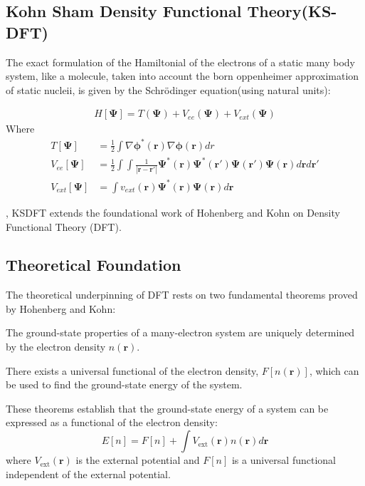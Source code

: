 \subsection{Kohn Sham Density Functional Theory(KS-DFT)}
The exact formulation of the Hamiltonial of the electrons of a static many body system, like a molecule, taken into account the born oppenheimer approximation of static nucleii, is given by the Schrödinger equation(using natural units):


\begin{align}
H[\mathbf{\Psi}] = T(\mathbf{\Psi}) + V_{ee}(\mathbf{\Psi}) + V_{ext}(\mathbf{\Psi})
\end{align}
Where
\begin{align}
    T[\mathbf{\Psi}] &= \frac{1}{2}\int\nabla\mathbf{\phi}^*(\mathbf{r})\nabla\mathbf{\phi}(\mathbf{r}) dr \\
    V_{ee}[\mathbf{\Psi}] &= \frac{1}{2}\int\int\frac{1}{|\mathbf{r}-\mathbf{r'}|}\mathbf{\Psi}^*(\mathbf{r})\mathbf{\Psi}^*(\mathbf{r}')\mathbf{\Psi}(\mathbf{r}')\mathbf{\Psi}(\mathbf{r})d\mathbf{r}d\mathbf{r'}\\
    V_{ext}[\mathbf{\Psi}] &= \int v_{ext}(\mathbf{r})\mathbf{\Psi}^*(\mathbf{r})\mathbf{\Psi}(\mathbf{r})d\mathbf{r}
    \end{align}

 \cite{KohnSham1965}, KSDFT extends the foundational work of Hohenberg and Kohn \cite{HohenbergKohn1964} on Density Functional Theory (DFT).
















\subsection{Theoretical Foundation}
The theoretical underpinning of DFT rests on two fundamental theorems proved by Hohenberg and Kohn:
\begin{theorem}
The ground-state properties of a many-electron system are uniquely determined by the electron density $n(\mathbf{r})$.
\end{theorem}
\begin{theorem}
There exists a universal functional of the electron density, $F[n(\mathbf{r})]$, which can be used to find the ground-state energy of the system.
\end{theorem}
These theorems establish that the ground-state energy of a system can be expressed as a functional of the electron density:
\begin{equation}
E[n] = F[n] + \int V_{\text{ext}}(\mathbf{r})n(\mathbf{r})d\mathbf{r}
\end{equation}
where $V_{\text{ext}}(\mathbf{r})$ is the external potential and $F[n]$ is a universal functional independent of the external potential.
